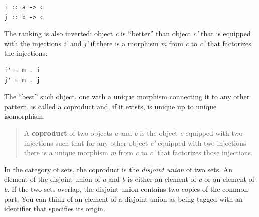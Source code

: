 \begin{verbatim}
i :: a -> c
j :: b -> c
\end{verbatim}

\begin{figure}[H]
\centering
{}
\end{figure}

\noindent
The ranking is also inverted: object \emph{c} is ``better'' than object
\emph{c'} that is equipped with the injections \emph{i'} and \emph{j'}
if there is a morphism \emph{m} from \emph{c} to \emph{c'} that
factorizes the injections:

\begin{verbatim}
i' = m . i
j' = m . j
\end{verbatim}

\begin{figure}[H]
\centering
{}
\end{figure}

\noindent
The ``best'' such object, one with a unique morphism connecting it to
any other pattern, is called a coproduct and, if it exists, is unique up
to unique isomorphism.

\begin{quote}
A \textbf{coproduct} of two objects \emph{a} and \emph{b} is the object
\emph{c} equipped with two injections such that for any other object
\emph{c'} equipped with two injections there is a unique morphism
\emph{m} from \emph{c} to \emph{c'} that factorizes those injections.
\end{quote}

\noindent
In the category of sets, the coproduct is the \emph{disjoint union} of
two sets. An element of the disjoint union of \emph{a} and \emph{b} is
either an element of \emph{a} or an element of \emph{b}. If the two sets
overlap, the disjoint union contains two copies of the common part. You
can think of an element of a disjoint union as being tagged with an
identifier that specifies its origin.

